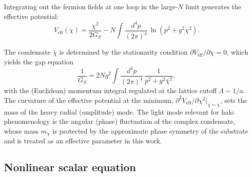 \documentclass[11pt,a4paper]{article}
\begin{document}
Integrating out the fermion fields at one loop in the large-$N$
limit generates the effective potential:
\begin{equation}
V_{\mathrm{eff}}(\chi) = \frac{\chi^2}{2G_S}
- N \int \frac{d^4 p}{(2\pi)^4}\,
\ln\!\left(p^2 + g^2\chi^2\right).
\label{eq:Veff}
\end{equation}

The condensate $\bar{\chi}$ is determined by the stationarity
condition $\partial V_{\mathrm{eff}}/\partial\chi = 0$, which
yields the gap equation
\begin{equation}
\frac{1}{G_S} = 2Ng^2 \int \frac{d^4 p}{(2\pi)^4}\,
\frac{1}{p^2 + g^2\bar{\chi}^2},
\label{eq:gap}
\end{equation}
with the (Euclidean) momentum integral regulated at the lattice
cutoff $\Lambda \sim 1/a$.
The curvature of the effective potential at the minimum,
$\partial^2 V_{\mathrm{eff}}/\partial\chi^2\big|_{\chi=\bar{\chi}}$,
sets the mass of the heavy radial (amplitude) mode.
The light mode relevant for halo phenomenology is the angular
(phase) fluctuation of the complex condensate, whose mass
$m_\chi$ is protected by the approximate phase symmetry of the
substrate and is treated as an effective parameter in this work.

\subsection{Nonlinear scalar equation}
\end{document}
